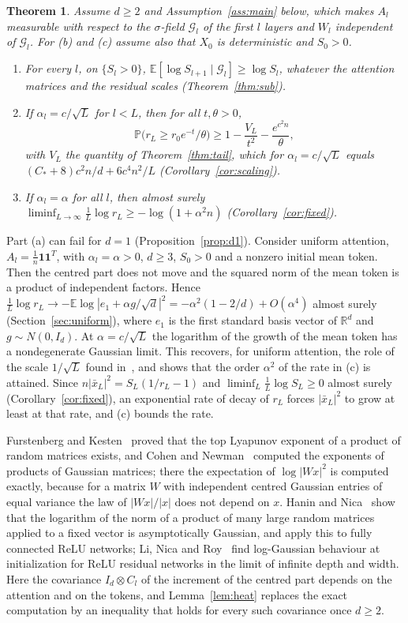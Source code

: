 \documentclass[11pt]{amsart}
\newtheorem{theorem}{Theorem}[section]
\theoremstyle{definition}
\theoremstyle{remark}
\numberwithin{equation}{section}
\newcommand{\EE}{\mathbb{E}}
\newcommand{\PP}{\mathbb{P}}
\newcommand{\RR}{\mathbb{R}}
\newcommand{\cG}{\mathcal{G}}
\begin{document}
\begin{theorem}\label{thm:intro}
Assume $d\ge2$ and Assumption~\ref{ass:main} below, which makes $A_l$ measurable with respect to the $\sigma$-field $\cG_l$ of the first $l$ layers and $W_l$ independent of $\cG_l$. For (b) and (c) assume also that $X_0$ is deterministic and $S_0>0$.
\begin{enumerate}[label=(\alph*)]
\item For every $l$, on $\{S_l>0\}$, $\EE[\log S_{l+1}\mid\cG_l]\ge\log S_l$, whatever the attention matrices and the residual scales (Theorem~\ref{thm:sub}).
\item If $\alpha_l=c/\sqrt L$ for $l<L$, then for all $t,\theta>0$,
\[
\PP\bigl(r_L\ge r_0e^{-t}/\theta\bigr)\ge1-\frac{V_L}{t^2}-\frac{e^{c^2n}}{\theta},
\]
with $V_L$ the quantity of Theorem~\ref{thm:tail}, which for $\alpha_l=c/\sqrt L$ equals $(C_*+8)c^2n/d+6c^4n^2/L$ (Corollary~\ref{cor:scaling}).
\item If $\alpha_l=\alpha$ for all $l$, then almost surely $\liminf_{L\to\infty}\frac1L\log r_L\ge-\log(1+\alpha^2n)$ (Corollary~\ref{cor:fixed}).
\end{enumerate}
\end{theorem}

Part (a) can fail for $d=1$ (Proposition~\ref{prop:d1}). Consider uniform attention, $A_l=\frac1n\mathbf 1\mathbf 1^{T}$, with $\alpha_l=\alpha>0$, $d\ge3$, $S_0>0$ and a nonzero initial mean token. Then the centred part does not move and the squared norm of the mean token is a product of independent factors. Hence $\frac1L\log r_L\to-\EE\log|e_1+\alpha g/\sqrt d|^2=-\alpha^2(1-2/d)+O(\alpha^4)$ almost surely (Section~\ref{sec:uniform}), where $e_1$ is the first standard basis vector of $\RR^d$ and $g\sim N(0,I_d)$. At $\alpha=c/\sqrt L$ the logarithm of the growth of the mean token has a nondegenerate Gaussian limit. This recovers, for uniform attention, the role of the scale $1/\sqrt L$ found in~\cite{NABOSL}, and shows that the order $\alpha^2$ of the rate in (c) is attained. Since $n|\bar x_L|^2=S_L(1/r_L-1)$ and $\liminf_L\frac1L\log S_L\ge0$ almost surely (Corollary~\ref{cor:fixed}), an exponential rate of decay of $r_L$ forces $|\bar x_L|^2$ to grow at least at that rate, and (c) bounds the rate.

Furstenberg and Kesten~\cite{FK} proved that the top Lyapunov exponent of a product of random matrices exists, and Cohen and Newman~\cite{CN} computed the exponents of products of Gaussian matrices; there the expectation of $\log|Wx|^2$ is computed exactly, because for a matrix $W$ with independent centred Gaussian entries of equal variance the law of $|Wx|/|x|$ does not depend on $x$. Hanin and Nica~\cite{HN} show that the logarithm of the norm of a product of many large random matrices applied to a fixed vector is asymptotically Gaussian, and apply this to fully connected ReLU networks; Li, Nica and Roy~\cite{LNR} find log-Gaussian behaviour at initialization for ReLU residual networks in the limit of infinite depth and width. Here the covariance $I_d\otimes C_l$ of the increment of the centred part depends on the attention and on the tokens, and Lemma~\ref{lem:heat} replaces the exact computation by an inequality that holds for every such covariance once $d\ge2$.
\end{document}

